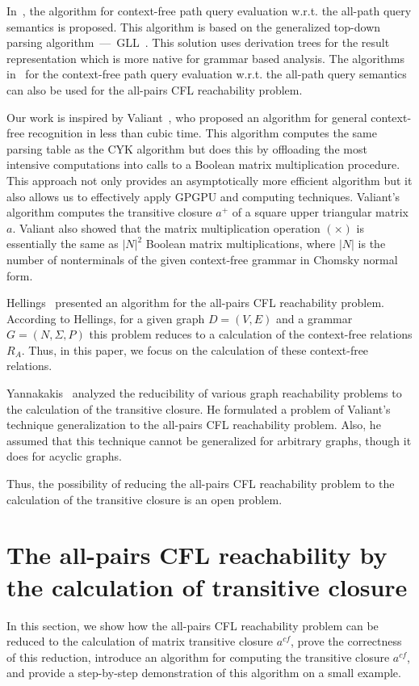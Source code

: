 \documentclass[runningheads,a4paper]{llncs}
\begin{document}
In~\cite{GLL}, the algorithm for context-free path query evaluation w.r.t. the all-path query semantics is proposed. This algorithm is based on the generalized top-down parsing algorithm~---~GLL~\cite{scott2010gll}. This solution uses derivation trees for the result representation which is more native for grammar based analysis. The algorithms in~\cite{GLL,hellingsPathQuerying} for the context-free path query evaluation w.r.t. the all-path query semantics can also be used for the all-pairs CFL reachability problem.

Our work is inspired by Valiant~\cite{valiant}, who proposed an algorithm for general context-free recognition in less than cubic time. This algorithm computes the same parsing table as the CYK algorithm but does this by offloading the most intensive computations into calls to a Boolean matrix multiplication procedure. This approach not only provides an asymptotically more efficient algorithm but it also allows us to effectively apply GPGPU and computing techniques. Valiant's algorithm computes the transitive closure $a^+$ of a square upper triangular matrix $a$. Valiant also showed that the matrix multiplication operation $(\times)$ is essentially the same as $|N|^2$ Boolean matrix multiplications, where $|N|$ is the number of nonterminals of the given context-free grammar in Chomsky normal form.

Hellings~\cite{hellingsRelational} presented an algorithm for the all-pairs CFL reachability problem. According to Hellings, for a given graph $D = (V, E)$ and a grammar $G = (N, \Sigma, P)$ this problem reduces to a calculation of the context-free relations $R_A$. Thus, in this paper, we focus on the calculation of these context-free relations.

Yannakakis~\cite{transitive-closure} analyzed the reducibility of various graph reachability problems to the calculation of the transitive closure. He formulated a problem of Valiant's technique generalization to the all-pairs CFL reachability problem. Also, he assumed that this technique cannot be generalized for arbitrary graphs, though it does for acyclic graphs.

Thus, the possibility of reducing the all-pairs CFL reachability problem to the calculation of the transitive closure is an open problem.

\section{The all-pairs CFL reachability by the calculation of transitive closure}%
In this section, we show how the all-pairs CFL reachability problem can be reduced to the calculation of matrix transitive closure $a^{cf}$, prove the correctness of this reduction, introduce an algorithm for computing the transitive closure $a^{cf}$, and provide a step-by-step demonstration of this algorithm on a small example.
\end{document}

